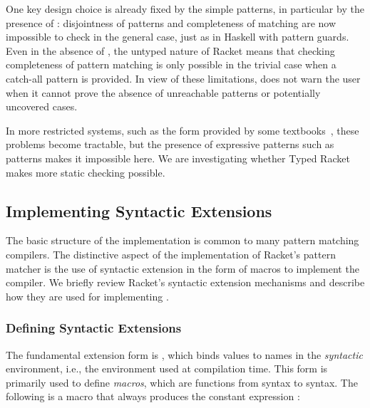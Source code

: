 \documentclass[onecolumn]{llncs}
\newcommand{\Scribtexttt}[1]{{\texttt{#1}}}
\newcommand{\SColorize}[2]{\color{#1}{#2}}
\newcommand{\inColor}[2]{{\Scribtexttt{\SColorize{#1}{#2}}}}
\newcommand{\RktKw}[1]{{\SColorize{black}{\Scribtexttt{#1}}}} \newcommand{\RktStxLink}[1]{\RktKw{#1}}
\newcommand{\RktSym}[1]{\inColor{IdentifierColor}{#1}}
\newcommand{\RktVal}[1]{\inColor{ValueColor}{#1}}
\begin{document}
One key design choice is already fixed by the simple patterns, in
particular by the presence of \RktKw{{\hbox{\texttt{?}}}}:
disjointness of patterns and completeness of matching are now impossible to check in the general
case, just as in Haskell with pattern guards.  Even in the absence of \RktKw{{\hbox{\texttt{?}}}}, the untyped nature of Racket
means that checking completeness of pattern matching is only possible in the trivial case when
 a catch{-}all
pattern is provided.  In view of these limitations, \RktSym{\RktStxLink{match}}
does not warn the user when it cannot prove the absence of unreachable
patterns or potentially uncovered cases.

In more restricted systems, such as the
\RktSym{cases} form provided by some textbooks~\cite{eopl3,plai},
these problems become tractable, but the presence of expressive
patterns such as \RktKw{{\hbox{\texttt{?}}}}
patterns makes it impossible here.  We are investigating whether Typed
Racket~\cite{thf:popl08} makes more static checking possible.

\subsection[Implementing Syntactic Extensions]{Implementing Syntactic Extensions}\label{t:x28part_x22Implementingx5fSyntacticx5fExtensionsx22x29}

The basic structure of the \RktSym{\RktStxLink{match}} implementation  is common to many pattern
matching compilers.  The distinctive aspect of the implementation of
Racket{'}s pattern matcher is the use of syntactic extension in the form
of macros to implement the  \RktSym{\RktStxLink{match}} compiler.  We briefly review
Racket{'}s syntactic extension mechanisms and describe how they are used
for implementing \RktSym{\RktStxLink{match}}.

\subsubsection[Defining Syntactic Extensions]{Defining Syntactic Extensions}\label{t:x28part_x22Definingx5fSyntacticx5fExtensionsx22x29}

The fundamental extension form is \RktSym{\RktStxLink{define{-}syntax}}, which binds
values to names in the \textit{syntactic} environment, i.e., the
environment used at compilation time.  This form is primarily used to
define \textit{macros}, which are functions from syntax to syntax.  The
following is a macro that always produces the constant expression
\RktVal{5}:
\end{document}
